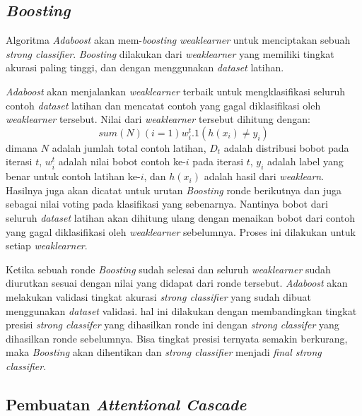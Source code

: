 \subsection{\emph{Boosting}}

Algoritma \emph{Adaboost} akan mem-\emph{boosting} \emph{weaklearner} untuk 
menciptakan sebuah \emph{strong classifier}. \emph{Boosting} dilakukan dari 
\emph{weaklearner} yang memiliki tingkat akurasi paling tinggi, dan dengan 
menggunakan \emph{dataset} latihan.

\emph{Adaboost} akan menjalankan \emph{weaklearner} terbaik untuk 
mengklasifikasi seluruh contoh \emph{dataset} latihan dan mencatat contoh yang 
gagal diklasifikasi oleh \emph{weaklearner} tersebut. 
Nilai dari \emph{weaklearner} 
tersebut dihitung dengan:
\begin{equation}
  sum(N)(i=1) w^t_i.1(h(x_i)\ne y_i)
\end{equation} 
dimana $N$ adalah jumlah total contoh latihan, $D_t$ adalah distribusi bobot pada 
iterasi $t$, $w^t_i$ adalah nilai bobot contoh ke-$i$ pada iterasi $t$, 
$y_i$ adalah label yang benar untuk contoh latihan ke-$i$, dan $h(x_i)$ 
adalah hasil dari \emph{weaklearn}. 
Hasilnya juga akan dicatat untuk urutan \emph{Boosting} ronde berikutnya dan 
juga sebagai nilai voting pada klasifikasi yang sebenarnya. 
Nantinya bobot dari seluruh \emph{dataset} latihan akan dihitung ulang dengan menaikan bobot dari contoh 
yang gagal diklasifikasi oleh \emph{weaklearner} sebelumnya. Proses ini dilakukan 
untuk setiap \emph{weaklearner}. 

Ketika sebuah ronde \emph{Boosting} sudah selesai dan seluruh \emph{weaklearner} sudah  diurutkan sesuai dengan 
nilai yang didapat dari ronde tersebut. \emph{Adaboost} akan melakukan validasi 
tingkat akurasi \emph{strong classifier} yang sudah dibuat menggunakan \emph{dataset} validasi. 
hal ini dilakukan dengan membandingkan tingkat presisi \emph{strong classifer} 
yang dihasilkan ronde ini dengan \emph{strong classifer} yang dihasilkan ronde 
sebelumnya. Bisa tingkat presisi ternyata semakin berkurang, maka \emph{Boosting} 
akan dihentikan dan \emph{strong classifier} 
menjadi \emph{final strong classifier}.

\subsection{Pembuatan \emph{Attentional Cascade}}

